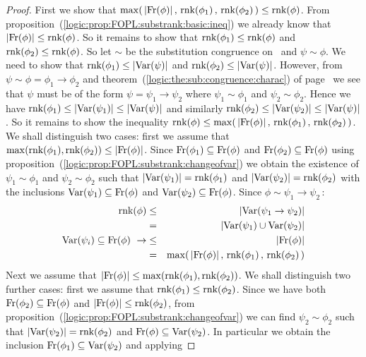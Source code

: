 \begin{proof}
First we show that
$\max(\,|\mbox{\rm Fr}(\phi)|\,,\,\mbox{\rm rnk}(\phi_{1})\,,\,\mbox{\rm rnk}(\phi_{2})\,)\leq\mbox{\rm rnk}(\phi)$.
From proposition~(\ref{logic:prop:FOPL:substrank:basic:ineq}) we
already know that $|\mbox{\rm Fr}(\phi)|\leq\mbox{\rm rnk}(\phi)$. So it remains to
show that $\mbox{\rm rnk}(\phi_{1})\leq\mbox{\rm rnk}(\phi)$ and
$\mbox{\rm rnk}(\phi_{2})\leq\mbox{\rm rnk}(\phi)$. So let $\sim$ be the substitution
congruence on \pv\ and $\psi\sim\phi$. We need to show that
$\mbox{\rm rnk}(\phi_{1})\leq|\mbox{\rm Var}(\psi)|$ and
$\mbox{\rm rnk}(\phi_{2})\leq|\mbox{\rm Var}(\psi)|$. However, from
$\psi\sim\phi=\phi_{1}\to\phi_{2}$ and
theorem~(\ref{logic:the:sub:congruence:charac}) of
page~\pageref{logic:the:sub:congruence:charac} we see that $\psi$
must be of the form $\psi=\psi_{1}\to\psi_{2}$ where
$\psi_{1}\sim\phi_{1}$ and $\psi_{2}\sim\phi_{2}$. Hence we have
$\mbox{\rm rnk}(\phi_{1})\leq|\mbox{\rm Var}(\psi_{1})|\leq|\mbox{\rm Var}(\psi)|$ and similarly
$\mbox{\rm rnk}(\phi_{2})\leq|\mbox{\rm Var}(\psi_{2})|\leq|\mbox{\rm Var}(\psi)|$. So it remains
to show the inequality
$\mbox{\rm rnk}(\phi)\leq\max(\,|\mbox{\rm Fr}(\phi)|\,,\,\mbox{\rm rnk}(\phi_{1})\,,\,\mbox{\rm rnk}(\phi_{2})\,)$.
We shall distinguish two cases: first we assume that
$\max(\mbox{\rm rnk}(\phi_{1}),\mbox{\rm rnk}(\phi_{2}))\leq|\mbox{\rm Fr}(\phi)|$. Since
$\mbox{\rm Fr}(\phi_{1})\subseteq\mbox{\rm Fr}(\phi)$ and
$\mbox{\rm Fr}(\phi_{2})\subseteq\mbox{\rm Fr}(\phi)$ using
proposition~(\ref{logic:prop:FOPL:substrank:changeofvar}) we obtain
the existence of $\psi_{1}\sim\phi_{1}$ and $\psi_{2}\sim\phi_{2}$
such that $|\mbox{\rm Var}(\psi_{1})|=\mbox{\rm rnk}(\phi_{1})$ and
$|\mbox{\rm Var}(\psi_{2})|=\mbox{\rm rnk}(\phi_{2})$ with the inclusions
$\mbox{\rm Var}(\psi_{1})\subseteq\mbox{\rm Fr}(\phi)$ and
$\mbox{\rm Var}(\psi_{2})\subseteq\mbox{\rm Fr}(\phi)$. Since
$\phi\sim\psi_{1}\to\psi_{2}$\,:
    \begin{eqnarray*}
    \rnk(\phi)&\leq&|\var(\psi_{1}\to\psi_{2})|\\
    &=&|\var(\psi_{1})\cup\var(\psi_{2})|\\
    \var(\psi_{i})\subseteq\free(\phi)\ \rightarrow&\leq&|\free(\phi)|\\
    &=&\max(\,|\free(\phi)|\,,\,\rnk(\phi_{1})\,,\,\rnk(\phi_{2})\,)
    \end{eqnarray*}
Next we assume that
$|\mbox{\rm Fr}(\phi)|\leq\max(\mbox{\rm rnk}(\phi_{1}),\mbox{\rm rnk}(\phi_{2}))$. We shall
distinguish two further cases: first we assume that
$\mbox{\rm rnk}(\phi_{1})\leq\mbox{\rm rnk}(\phi_{2})$. Since we have both
$\mbox{\rm Fr}(\phi_{2})\subseteq\mbox{\rm Fr}(\phi)$ and
$|\mbox{\rm Fr}(\phi)|\leq\mbox{\rm rnk}(\phi_{2})$, from
proposition~(\ref{logic:prop:FOPL:substrank:changeofvar}) we can
find $\psi_{2}\sim\phi_{2}$ such that
$|\mbox{\rm Var}(\psi_{2})|=\mbox{\rm rnk}(\phi_{2})$ and
$\mbox{\rm Fr}(\phi)\subseteq\mbox{\rm Var}(\psi_{2})$. In particular we obtain the
inclusion $\mbox{\rm Fr}(\phi_{1})\subseteq\mbox{\rm Var}(\psi_{2})$ and applying

\end{proof}
